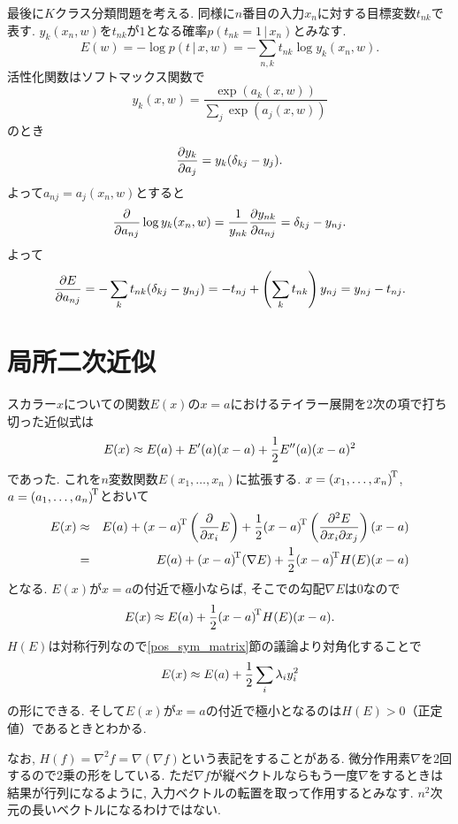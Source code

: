 最後に$K$クラス分類問題を考える. 同様に$n$番目の入力$x_n$に対する目標変数$t_{nk}$で表す.
$y_k(x_n,w)$を$t_{nk}$が$1$となる確率$p(t_{nk}=1\,|\,x_n)$とみなす.
$$
E(w) = -\log p(t\,|\,x,w)=-\sum_{n,k} t_{nk} \log y_k(x_n,w).
$$
活性化関数はソフトマックス関数で
$$
y_k(x,w)=\frac{\exp(a_k(x,w))}{\sum_j \exp(a_j(x,w))}
$$
のとき
$$
\diff{a_j}{y_k}=y_k(\delta_{kj}-y_j).
$$
よって$a_{nj}=a_j(x_n,w)$とすると
$$
\dif{a_{nj}}\log y_k(x_n,w)=\frac{1}{y_{nk}}\diff{a_{nj}}{y_{nk}}=\delta_{kj}-y_{nj}.
$$
よって
$$
\diff{a_{nj}}{E}=-\sum_k t_{nk}(\delta_{kj}-y_{nj})=-t_{nj}+\left(\sum_k t_{nk}\right)y_{nj}=y_{nj}-t_{nj}.
$$
\vspace{0pt}

\section{局所二次近似}\label{ch5_loc}
スカラー$x$についての関数$E(x)$の$x=a$におけるテイラー展開を2次の項で打ち切った近似式は
$$
E(x) \approx E(a) + E'(a)(x-a) + \half E''(a) (x-a)^2
$$
であった. これを$n$変数関数$E(x_1, \ldots, x_n)$に拡張する.
$x=\trans{(x_1, \ldots, x_n)}$, $a=\trans{(a_1, \ldots, a_n)}$とおいて
\begin{eqnarray*}
E(x)
 &\approx& E(a) + \trans{(x-a)}\left(\dif{x_i}E\right) + \half \trans{(x-a)}\left(\ddiff{x_i}{x_j}{E}\right)(x-a)\\
 &=&       E(a) + \trans{(x-a)} (\nabla E) + \half \quads{H(E)}{(x-a)}
\end{eqnarray*}
となる.
$E(x)$が$x=a$の付近で極小ならば, そこでの勾配$\nabla E$は$0$なので
$$
E(x) \approx E(a) + \half \quads{H(E)}{(x-a)}.
$$
$H(E)$は対称行列なので\ref{pos_sym_matrix}節の議論より対角化することで
$$
E(x) \approx E(a) + \half \sum_i \lambda_i y_i^2
$$
の形にできる. そして$E(x)$が$x=a$の付近で極小となるのは$H(E)>0$（正定値）であるときとわかる.

なお, $H(f)=\nabla^2 f = \nabla(\nabla f)$という表記をすることがある. 微分作用素$\nabla$を2回するので2乗の形をしている.
ただ$\nabla f$が縦ベクトルならもう一度$\nabla$をするときは結果が行列になるように,
入力ベクトルの転置を取って作用するとみなす.
$n^2$次元の長いベクトルになるわけではない.

